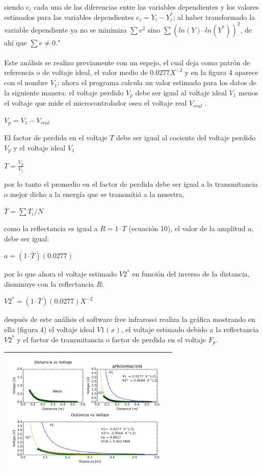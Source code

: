 \documentclass[12]{article}
\newenvironment{Figure}
{\par\medskip\noindent\minipage{\linewidth}}
{\endminipage\par\medskip}
\begin{document}
\begin{multicols}{2}
siendo $e_{i}$ cada una de las diferencias entre las variables dependientes y los valores estimados para las variables dependientes $e_{i} = Y_{i} - Y^{*}_{i}$; al haber transformado la variable dependiente ya no se minimiza $\sum e^{2}$ sino $\sum (ln(Y) – ln(Y^{*}))^{2}$, de ahí que $\sum e \neq 0$."\cite{ESTADISTICA}\\\\
Este análisis se realizo previamente con un espejo, el cual deja como patrón de referencia o de voltaje ideal, el  valor medio de $0.0277 X ^{-2}$  y en la figura 4 aparece con el nombre $V_{1}$; ahora el programa calcula un valor estimado para los datos de la siguiente manera: el voltaje perdido $V_{p}$ debe ser igual al voltaje ideal $V_{1}$ menos el voltaje que mide el microcontrolador osea el voltaje real $V_{real}$ .
\begin{center}
$V_{p} = V_{1} - V_{real}$
\end {center}
El factor de perdida en el voltaje $T$ debe ser igual al cociente del voltaje perdido $V_{p}$ y el voltaje ideal $V_{1}$
\begin{center}
$T=\frac{V_{p}}{V_{1}} $
\end{center}
por lo tanto el promedio en el factor de perdida debe ser igual a la transmitancia o mejor dicho a la energía que se transmitió a la muestra,  
\begin{center}
$\bar{T} = \sum{T_{i}}/N$
\end{center} 
como la reflectancia es igual a $R = 1 – T $ (ecuación 10), el valor de la amplitud $a$, debe ser igual:
\begin{center}
 $ a = (1 – \bar{T}) (0.0277)$
\end{center}
por lo que ahora el voltaje estimado $V2^{*}$ en función del inverso de la distancia, disminuye con la reflectancia $R$: 
\begin{center}
 $ V2^{*} = (1 – \bar{T}) (0.0277) X^{-2}$
\end{center}
después de este análisis el software free infrarossi  realiza la gráfica mostrando en ella (figura 4) el voltaje ideal $V1(x)$, el voltaje estimado debido a la reflectancia $V2^{*}$ y el factor de transmitancia o factor de perdida en el voltaje $F_{p}$.
\vspace{0.3cm}
\begin{Figure}	
\center
\begin{tabular}{|l|r|}
\hline
\includegraphics[width=8cm, height=6cm]{img/azul.png} \\ \hline

\end{tabular}
\end{Figure}
\end{multicols}
\end{document}
